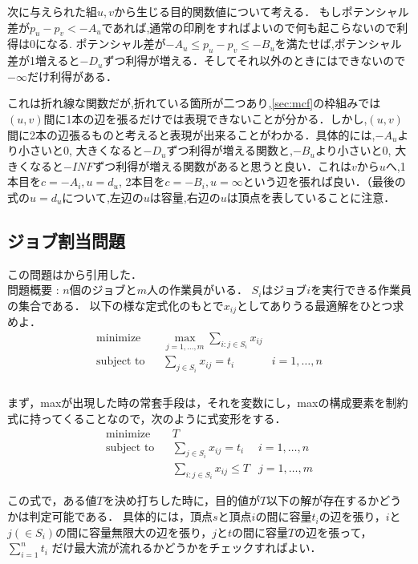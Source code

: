 \documentclass[13pt]{jarticle}
\theoremstyle{nonitalic} %
\begin{document}
次に与えられた組$u,v$から生じる目的関数値について考える．
もしポテンシャル差が$p_u - p_v < -A_u$であれば,通常の印刷をすればよいので何も起こらないので利得は0になる. ポテンシャル差が$-A_u \leq p_u - p_v \leq  -B_u$を満たせば,ポテンシャル差が1増えると$-D_u$ずつ利得が増える．そしてそれ以外のときにはできないので$-\infty$だけ利得がある．

これは折れ線な関数だが,折れている箇所が二つあり,\ref{sec:mcf}の枠組みでは$(u,v)$間に1本の辺を張るだけでは表現できないことが分かる．しかし,$(u,v)$間に2本の辺張るものと考えると表現が出来ることがわかる．具体的には,$-A_u$より小さいと0, 大きくなると$-D_u$ずつ利得が増える関数と,$-B_u$より小さいと0, 大きくなると$-INF$ずつ利得が増える関数があると思うと良い．これは$v$から$u$へ,1本目を$c = -A_i, u=d_u$, 2本目を$c=-B_i, u=\infty$という辺を張れば良い．（最後の式の$u=d_u$について,左辺の$u$は容量,右辺の$u$は頂点を表していることに注意．


\subsection{ジョブ割当問題}
この問題は\cite{combopt}から引用した．\\

問題概要 : $n$個のジョブと$m$人の作業員がいる．
$S_i$はジョブ$i$を実行できる作業員の集合である．
以下の様な定式化のもとで$x_{ij}$としてありうる最適解をひとつ求めよ．
\begin{align}
  &&&&& \textrm{minimize}   && \max_{j=1,\dots,m} \sum_{i:j \in S_i} x_{ij} \\
  &&&&& \textrm{subject to} && \sum_{j \in S_i} x_{ij} = t_i  & i=1,\dots,n &&&&&\\
\end{align}\\


まず，maxが出現した時の常套手段は，それを変数にし，maxの構成要素を制約式に持ってくることなので，次のように式変形をする．
\begin{align}
  &&&&& \textrm{minimize}   && T \\
  &&&&& \textrm{subject to} && \sum_{j \in S_i} x_{ij} = t_i  & i=1,\dots,n &&&&&\\
  &&&&&                     &&  \sum_{i:j \in S_i} x_{ij} \leq T & j=1,\dots,m
\end{align}

この式で，ある値$T$を決め打ちした時に，目的値が$T$以下の解が存在するかどうかは判定可能である． 具体的には，頂点$s$と頂点$i$の間に容量$t_i$の辺を張り，$i$と$j (\in S_i)$の間に容量無限大の辺を張り，$j$と$t$の間に容量$T$の辺を張って，$\sum_{i=1}^n t_i $ だけ最大流が流れるかどうかをチェックすればよい．
\end{document}
